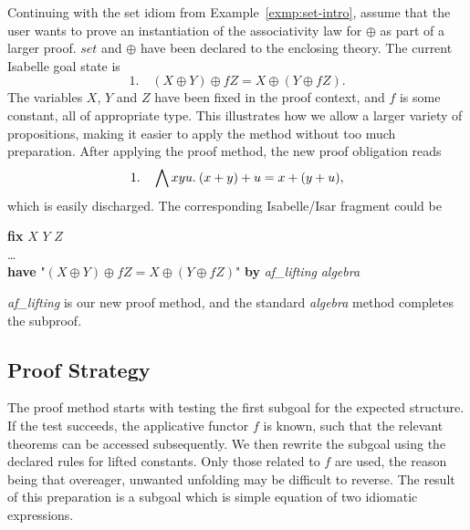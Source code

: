 \begin{example}\label{exmp:set-usage}
Continuing with the set idiom from Example~\ref{exmp:set-intro}, assume that
the user wants to prove an instantiation of the associativity law for $\oplus$
as part of a larger proof.
$\mathit{set}$ and $\oplus$ have been declared to the enclosing theory.
The current Isabelle goal state is
\[ 1. \quad (X \oplus Y) \oplus f Z = X \oplus (Y \oplus f Z). \]
The variables $X$, $Y$ and $Z$ have been fixed in the proof context, and $f$ is
some constant, all of appropriate type.
This illustrates how we allow a larger variety of propositions, making it
easier to apply the method without too much preparation.
After applying the proof method, the new proof obligation reads
\[ 1. \quad \bigwedge x y u.\>(x + y) + u = x + (y + u), \]
which is easily discharged.
The corresponding Isabelle/Isar fragment could be
\begin{isabelle}
	\textbf{fix} $X$ $Y$ $Z$ \\
	\dots \\
	\textbf{have} "$(X \oplus Y) \oplus f Z = X \oplus (Y \oplus f Z)$"
		\textbf{by} \textit{af\_lifting} \textit{algebra}
\end{isabelle}
\textit{af\_lifting} is our new proof method, and the standard \textit{algebra}
method completes the subproof.
\end{example}

\subsection{Proof Strategy}\label{subsec:proof-strategy}


The proof method starts with testing the first subgoal for the expected
structure.
If the test succeeds, the applicative functor $f$ is known, such that the
relevant theorems can be accessed subsequently.
We then rewrite the subgoal using the declared rules for lifted constants.
Only those related to $f$ are used, the reason being that overeager, unwanted
unfolding may be difficult to reverse.
The result of this preparation is a subgoal which is simple equation of two
idiomatic expressions.

